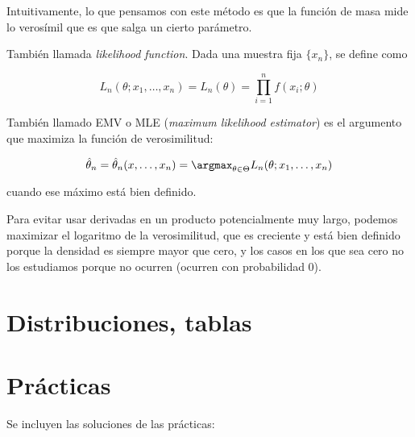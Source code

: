 \documentclass[palatino,nochap]{apuntes}
\begin{document}
Intuitivamente, lo que pensamos con este método es que la función de masa mide lo verosímil que es que salga un cierto parámetro.

\begin{defn} También llamada \textit{likelihood function}. Dada una muestra fija $\{x_n\}$, se define como

\[ L_n(\theta;x_1,\dotsc,x_n) = L_n(\theta) = \prod_{i=1}^n f(x_i;\theta) \]
\end{defn}

\begin{defn}\label{defEMV} También llamado EMV o MLE (\textit{maximum likelihood estimator}) es el argumento que maximiza la función de verosimilitud:

\[ \hat{\theta}_n = \hat{\theta}_n(x,\dotsc,x_n) = \argmax_{\theta\in\Theta} L_n(\theta;x_1,\dotsc,x_n) \]

cuando ese máximo está bien definido.
\end{defn}

Para evitar usar derivadas en un producto potencialmente muy largo, podemos maximizar el logaritmo de la verosimilitud, que es creciente y está bien definido porque la densidad es siempre mayor que cero, y los casos en los que sea cero no los estudiamos porque no ocurren (ocurren con probabilidad 0).


\chapter{Distribuciones, tablas}



\chapter{Prácticas}
Se incluyen las soluciones de las prácticas:



{}

\printindex
\end{document}
